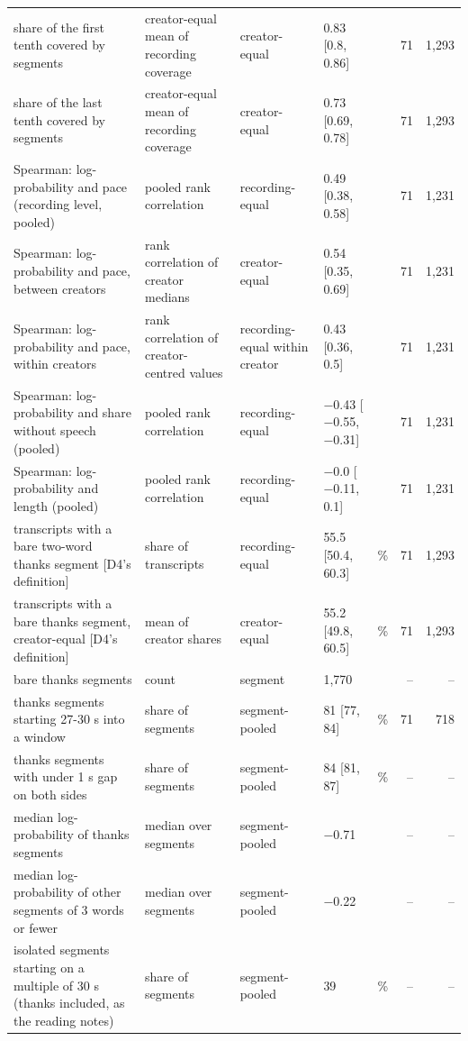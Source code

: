 {\begin{tabular}{@{}p{}p{}p{}lp{}rr@{}}
share of the first tenth covered by segments & creator-equal mean of recording coverage & creator-equal & 0.83 [0.8, 0.86] &  & 71 & 1{,}293 \\
share of the last tenth covered by segments & creator-equal mean of recording coverage & creator-equal & 0.73 [0.69, 0.78] &  & 71 & 1{,}293 \\
Spearman: log-probability and pace (recording level, pooled) & pooled rank correlation & recording-equal & 0.49 [0.38, 0.58] &  & 71 & 1{,}231 \\
Spearman: log-probability and pace, between creators & rank correlation of creator medians & creator-equal & 0.54 [0.35, 0.69] &  & 71 & 1{,}231 \\
Spearman: log-probability and pace, within creators & rank correlation of creator-centred values & recording-equal within creator & 0.43 [0.36, 0.5] &  & 71 & 1{,}231 \\
Spearman: log-probability and share without speech (pooled) & pooled rank correlation & recording-equal & \ensuremath{-}0.43 [\ensuremath{-}0.55, \ensuremath{-}0.31] &  & 71 & 1{,}231 \\
Spearman: log-probability and length (pooled) & pooled rank correlation & recording-equal & \ensuremath{-}0.0 [\ensuremath{-}0.11, 0.1] &  & 71 & 1{,}231 \\
transcripts with a bare two-word thanks segment [D4's definition] & share of transcripts & recording-equal & 55.5 [50.4, 60.3] & \% & 71 & 1{,}293 \\
transcripts with a bare thanks segment, creator-equal [D4's definition] & mean of creator shares & creator-equal & 55.2 [49.8, 60.5] & \% & 71 & 1{,}293 \\
bare thanks segments & count & segment & 1{,}770 &  & -- & -- \\
thanks segments starting 27-30 s into a window & share of segments & segment-pooled & 81 [77, 84] & \% & 71 & 718 \\
thanks segments with under 1 s gap on both sides & share of segments & segment-pooled & 84 [81, 87] & \% & -- & -- \\
median log-probability of thanks segments & median over segments & segment-pooled & \ensuremath{-}0.71 &  & -- & -- \\
median log-probability of other segments of 3 words or fewer & median over segments & segment-pooled & \ensuremath{-}0.22 &  & -- & -- \\
isolated segments starting on a multiple of 30 s (thanks included, as the reading notes) & share of segments & segment-pooled & 39 & \% & -- & -- \\

\end{tabular}}
